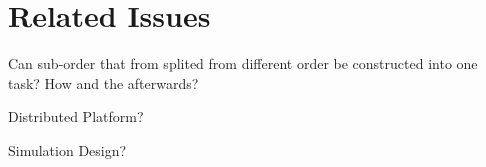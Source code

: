 \section{Related Issues} %
\label{sec:problem}

Can sub-order that from splited from different order be constructed into one task? How and the afterwards?

Distributed Platform?

Simulation Design?


